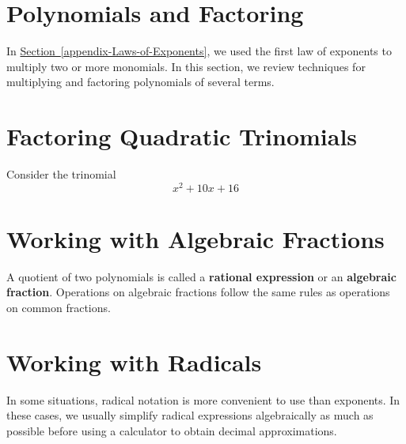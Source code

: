 \documentclass[10pt,]{book}
\newcommand{\terminology}[1]{\textbf{#1}}
\theoremstyle{plain}
\theoremstyle{definition}
\theoremstyle{definition}
\theoremstyle{definition}
\theoremstyle{definition}
\numberwithin{equation}{section}
\begin{document}
\section[Polynomials and Factoring]{Polynomials and Factoring}\label{appendix-Polynomials-and-Factoring}
In \hyperref[appendix-Laws-of-Exponents]{Section~\ref{appendix-Laws-of-Exponents}}, we used the first law of exponents to multiply two or more monomials. In this section, we review techniques for multiplying and factoring polynomials of several terms.%
\typeout{************************************************}
\typeout{************************************************}
\section[Factoring Quadratic Trinomials]{Factoring Quadratic Trinomials}\label{appendix-Factoring-Quadratic-Trinomials}
Consider the trinomial
            \begin{equation*}
                x^2 + 10x + 16
            \end{equation*}
\typeout{************************************************}
\typeout{************************************************}
\section[Working with Algebraic Fractions]{Working with Algebraic Fractions}\label{appendix-Working-with-Algebraic-Fractions}

            A quotient of two polynomials is called a \terminology{rational expression} or an \terminology{algebraic fraction}. Operations on algebraic fractions follow the same rules as operations on common fractions.
\typeout{************************************************}
\typeout{************************************************}
\section[Working with Radicals]{Working with Radicals}\label{appendix-Working-with-Radicals}
In some situations, radical notation is more convenient to use than exponents. In these cases, we usually simplify radical expressions algebraically as much as possible before using a calculator to obtain decimal approximations.%
\typeout{************************************************}
\typeout{************************************************}
\end{document}
